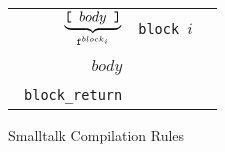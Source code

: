 \documentclass[11pt]{article}
\begin{document}
\begin{figure}
\begin{center}
\begin{tabular}[t]{|r|l| l |}
$\underbrace{\text{\tt [ $body$ ]}}_{\text{\tt f}^{block_i}}$ & {\tt block }$i$ &
\begin{minipage}[t]{0.35\linewidth}
$\text{\tt f}_{block_i}=$\\
\parbox{20pt}{~}$body$\\
\parbox{20pt}{~}{\tt block\_return}
\end{minipage} \\
\hline
\end{tabular}
\end{center}
\vspace{-10pt}
\caption{Smalltalk Compilation Rules}
\label{default}
\end{figure}%


\begin{minipage}[t]{0.25\linewidth}
\end{minipage} 

\begin{minipage}[t]{0.25\linewidth}
\begin{alltt}
\end{alltt}
\end{minipage} 
\end{document}
